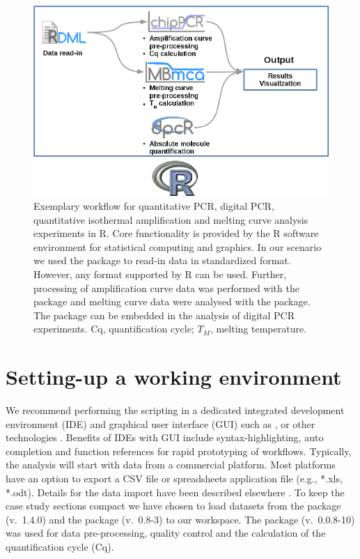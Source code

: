 \begin{figure}[htbp]
  \centering
  \includegraphics[clip=true,trim=0cm 0cm 0cm 0cm]{figures/workflow.png}
  \caption{Exemplary workflow for quantitative PCR, digital PCR, quantitative 
isothermal amplification and melting curve analysis experiments in R. Core 
functionality is provided by the R software environment for statistical 
computing and graphics. In our scenario we used the  package to 
read-in data in standardized format. However, any format supported by R can be 
used. Further, processing of amplification curve data was performed with the 
 package and melting curve data were analysed with the 
 package. The  package can be embedded in the 
analysis of digital PCR experiments. Cq, quantification cycle; $T_{M}$, melting 
temperature. 
} 
\label{figure:workflow}
\end{figure}

\section{Setting-up a working environment}

We recommend performing the scripting in a dedicated integrated development 
environment (IDE) and graphical user interface (GUI) such as  
\citep{rodiger_rkward_2012},  \citep{RStudio, gandrud_2013} or 
other technologies \citep{Valero_2012}. Benefits of IDEs with GUI include 
syntax-highlighting, auto completion and function references for rapid 
prototyping of workflows. Typically, the analysis will start with data from a 
commercial platform. Most platforms have an option to export a CSV file or 
spreadsheets application file (e.g., *.xls, *.odt). Details for the data 
import have been described elsewhere \citep{RDCT2010c, rodiger_rkward_2012}. To 
keep the case study sections compact we have chosen to load datasets from the 
 package \citep{ritz_2008} (v.~1.4.0) and the  
package (v.~0.8-3) to our workspace. The  package 
\citep{roediger_2015_Bioinformatics} (v.~0.0.8-10) was used for data 
pre-processing, quality control and  the calculation of the quantification cycle 
(Cq).

